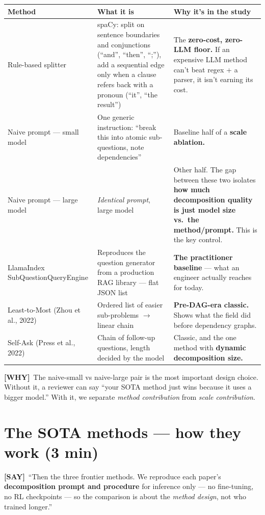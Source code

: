 \documentclass[11pt]{article}
\newcommand{\say}{\textcolor{sayc}{\textbf{[SAY]}}\ }
\newcommand{\why}{\textcolor{whyc}{\textbf{[WHY]}}\ }
\begin{document}
\begin{tabularx}{\linewidth}{@{}>{\raggedright\arraybackslash}p{2.5cm} Y Y@{}}
\toprule
\textbf{Method} & \textbf{What it is} & \textbf{Why it's in the study} \\
\midrule
Rule-based splitter &
spaCy: split on sentence boundaries and conjunctions (``and'', ``then'', ``;''),
add a sequential edge only when a clause refers back with a pronoun (``it'', ``the
result'') &
The \textbf{zero-cost, zero-LLM floor.} If an expensive LLM method can't beat
regex + a parser, it isn't earning its cost. \\
\addlinespace
Naive prompt --- small model &
One generic instruction: ``break this into atomic sub-questions, note
dependencies'' &
Baseline half of a \textbf{scale ablation.} \\
\addlinespace
Naive prompt --- large model &
\emph{Identical prompt}, large model &
Other half. The gap between these two isolates \textbf{how much decomposition
quality is just model size vs.\ the method/prompt.} This is the key control. \\
\addlinespace
LlamaIndex SubQuestionQueryEngine &
Reproduces the question generator from a production RAG library --- flat JSON list &
\textbf{The practitioner baseline} --- what an engineer actually reaches for today. \\
\addlinespace
Least-to-Most (Zhou et al., 2022) &
Ordered list of easier sub-problems $\rightarrow$ linear chain &
\textbf{Pre-DAG-era classic.} Shows what the field did before dependency graphs. \\
\addlinespace
Self-Ask (Press et al., 2022) &
Chain of follow-up questions, length decided by the model &
Classic, and the one method with \textbf{dynamic decomposition size.} \\
\bottomrule
\end{tabularx}

\why The naive-small vs naive-large pair is the most important design choice.
Without it, a reviewer can say ``your SOTA method just wins because it uses a
bigger model.'' With it, we separate \emph{method contribution} from \emph{scale
contribution}.

\section{The SOTA methods --- how they work (3 min)}

\say ``Then the three frontier methods. We reproduce each paper's
\textbf{decomposition prompt and procedure} for inference only --- no fine-tuning,
no RL checkpoints --- so the comparison is about the \emph{method design}, not who
trained longer.''
\end{document}
